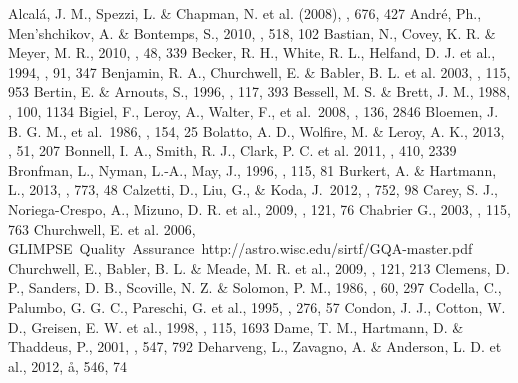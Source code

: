 \documentclass[iop]{emulateapj}
\begin{document}
\begin{thebibliography}{}
 Alcal\'a, J. M., Spezzi, L. \& Chapman, N. et al. (2008), \apj, 676, 427
 Andr\'e, Ph., Men'shchikov, A. \& Bontemps, S., 2010, \aap, 518, 102
 Bastian, N., Covey, K. R. \& Meyer, M. R., 2010, \araa, 48, 339
 Becker, R. H., White, R. L., Helfand, D. J. et al., 1994, \apjs, 91, 347
 Benjamin, R. A., Churchwell, E. \& Babler, B. L. et al. 2003, \pasp, 115, 953
 Bertin, E. \& Arnouts, S., 1996, \aap, 117, 393
 Bessell, M. S. \& Brett, J. M., 1988, \pasp, 100, 1134
 Bigiel, F., Leroy, A., Walter, F., et al.\ 2008, \aj, 136, 2846
{ Bloemen, J. B. G. M.,  et al.\ 1986, \aap, 154, 25}
 Bolatto, A. D., Wolfire, M. \& Leroy, A. K., 2013, \araa, 51, 207
 Bonnell, I. A., Smith, R. J., Clark, P. C. et al. 2011, \mnras, 410, 2339
 Bronfman, L., Nyman, L.-A., May, J., 1996, \aap, 115, 81
 Burkert, A. \& Hartmann, L., 2013, \apj, 773, 48
 Calzetti, D., Liu, G., 
\& Koda, J.\ 2012, \apj, 752, 98 
 Carey, S. J., Noriega-Crespo, A., Mizuno, D. R. et al., 2009, \pasp, 121, 76
 Chabrier G., 2003, \pasp, 115, 763
{ Churchwell, E. et al. 2006, GLIMPSE~Quality~Assurance~http://astro.wisc.edu/sirtf/GQA-master.pdf }
 Churchwell, E., Babler, B. L. \& Meade, M. R. et al., 2009, \pasp, 121, 213
{ Clemens, D. P., Sanders, D. B., Scoville, N. Z. \& Solomon, P. M., 1986, \apjs, 60, 297}
 Codella, C., Palumbo, G. G. C., Pareschi, G. et al., 1995, \mnras, 276, 57
 Condon, J. J., Cotton, W. D., Greisen, E. W. et al., 1998, \aj, 115, 1693
 Dame, T. M., Hartmann, D. \& Thaddeus, P., 2001, \apj, 547, 792
 Deharveng, L.,  Zavagno, A. \& Anderson, L. D. et al., 2012, \aa, 546, 74

\end{thebibliography}
\end{document}
